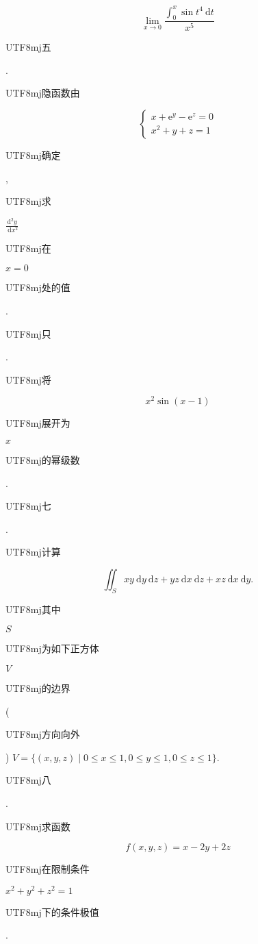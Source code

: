 \documentclass[10pt]{article}
\begin{document}
$$
\lim _{x \rightarrow 0} \frac{\int_{0}^{x} \sin t^{4} \mathrm{~d} t}{x^{5}}
$$
\begin{CJK}{UTF8}{mj}五\end{CJK}. \begin{CJK}{UTF8}{mj}隐函数由\end{CJK}
$$
\left\{\begin{array}{l}
x+\mathrm{e}^{y}-\mathrm{e}^{z}=0 \\
x^{2}+y+z=1
\end{array}\right.
$$
\begin{CJK}{UTF8}{mj}确定\end{CJK}, \begin{CJK}{UTF8}{mj}求\end{CJK} $\frac{\mathrm{d}^{2} y}{\mathrm{~d} x^{2}}$ \begin{CJK}{UTF8}{mj}在\end{CJK} $x=0$ \begin{CJK}{UTF8}{mj}处的值\end{CJK}.

\begin{CJK}{UTF8}{mj}只\end{CJK}. \begin{CJK}{UTF8}{mj}将\end{CJK}
$$
x^{2} \sin (x-1)
$$
\begin{CJK}{UTF8}{mj}展开为\end{CJK} $x$ \begin{CJK}{UTF8}{mj}的幂级数\end{CJK}.

\begin{CJK}{UTF8}{mj}七\end{CJK}. \begin{CJK}{UTF8}{mj}计算\end{CJK}
$$
\iint_{S} x y \mathrm{~d} y \mathrm{~d} z+y z \mathrm{~d} x \mathrm{~d} z+x z \mathrm{~d} x \mathrm{~d} y .
$$
\begin{CJK}{UTF8}{mj}其中\end{CJK} $S$ \begin{CJK}{UTF8}{mj}为如下正方体\end{CJK} $V$ \begin{CJK}{UTF8}{mj}的边界\end{CJK} (\begin{CJK}{UTF8}{mj}方向向外\end{CJK}) $V=\{(x, y, z) \mid 0 \leq x \leq 1,0 \leq y \leq 1,0 \leq z \leq 1\}$.

\begin{CJK}{UTF8}{mj}八\end{CJK}. \begin{CJK}{UTF8}{mj}求函数\end{CJK}
$$
f(x, y, z)=x-2 y+2 z
$$
\begin{CJK}{UTF8}{mj}在限制条件\end{CJK} $x^{2}+y^{2}+z^{2}=1$ \begin{CJK}{UTF8}{mj}下的条件极值\end{CJK}.
\end{document}
